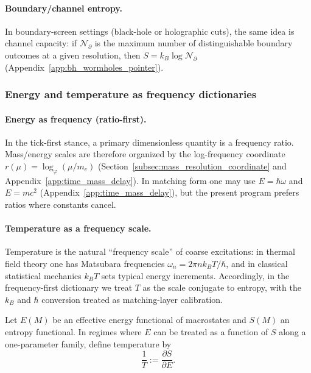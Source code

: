 \paragraph{Boundary/channel entropy.}
\InterfaceTag In boundary-screen settings (black-hole or holographic cuts), the same idea is channel capacity:
if $\mathcal{N}_\partial$ is the maximum number of distinguishable boundary outcomes at a given resolution, then $S=k_B\log\mathcal{N}_\partial$ (Appendix~\ref{app:bh_wormholes_pointer}).

\subsubsection{Energy and temperature as frequency dictionaries}
\label{subsec:energy_temperature_frequency}

\paragraph{Energy as frequency (ratio-first).}
\InterfaceTag In the tick-first stance, a primary dimensionless quantity is a frequency ratio.
Mass/energy scales are therefore organized by the log-frequency coordinate $r(\mu)=\log_\varphi(\mu/m_e)$ (Section~\ref{subsec:mass_resolution_coordinate} and Appendix~\ref{app:time_mass_delay}).
In matching form one may use $E=\hbar\omega$ and $E=mc^2$ (Appendix~\ref{app:time_mass_delay}), but the present program prefers ratios where constants cancel.

\paragraph{Temperature as a frequency scale.}
\InterfaceTag Temperature is the natural ``frequency scale'' of coarse excitations:
in thermal field theory one has Matsubara frequencies $\omega_n=2\pi n k_BT/\hbar$, and in classical statistical mechanics $k_BT$ sets typical energy increments.
Accordingly, in the frequency-first dictionary we treat $T$ as the scale conjugate to entropy, with the $k_B$ and $\hbar$ conversion treated as matching-layer calibration.

\begin{definition}
\label{def:temperature_conjugate}
Let $E(M)$ be an effective energy functional of macrostates and $S(M)$ an entropy functional.
In regimes where $E$ can be treated as a function of $S$ along a one-parameter family, define temperature by
\[
\frac{1}{T}:=\frac{\partial S}{\partial E}.
\]
\end{definition}

